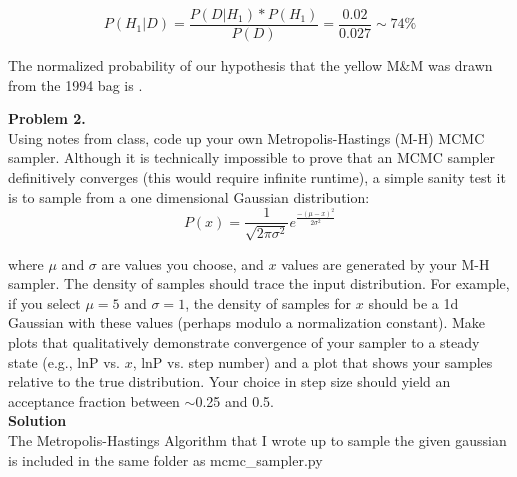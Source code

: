 \documentclass[12pt,usletter,english]{article}
\begin{document}
\begin{equation}
  P(H_1|D) = \frac{P(D|H_1)*P(H_1)}{P(D)} = \frac{0.02}{0.027} \sim 74\%
\end{equation}

The normalized probability of our hypothesis that the yellow M\&M was
drawn from the 1994 bag is .



\noindent \textbf{Problem 2.} \\ 

Using notes from class, code up your own Metropolis-Hastings (M-H)
MCMC sampler.  Although it is technically impossible to prove that an
MCMC sampler definitively converges (this would require infinite
runtime), a simple sanity test it is to sample from a one dimensional
Gaussian distribution:
\begin{equation}
P(x)= \frac{1}{\sqrt{2\pi\sigma^2}} e^\frac{-(\mu-x)^2}{2\sigma^2}
\end{equation}

\noindent where $\mu$ and $\sigma$ are values you choose, and $x$
values are generated by your M-H sampler.  The density of samples
should trace the input distribution.  For example, if you select
$\mu=5$ and $\sigma=1$, the density of samples for $x$ should be a 1d
Gaussian with these values (perhaps modulo a normalization
constant). Make plots that qualitatively demonstrate convergence of
your sampler to a steady state (e.g., lnP vs. $x$, lnP vs. step
number) and a plot that shows your samples relative to the true
distribution. Your choice in step size should yield an acceptance
fraction between $\sim$0.25 and 0.5. \\

\noindent \textbf{Solution}\\

The Metropolis-Hastings Algorithm that I wrote up to sample the given
gaussian is included in the same folder as mcmc_sampler.py
\end{document}

